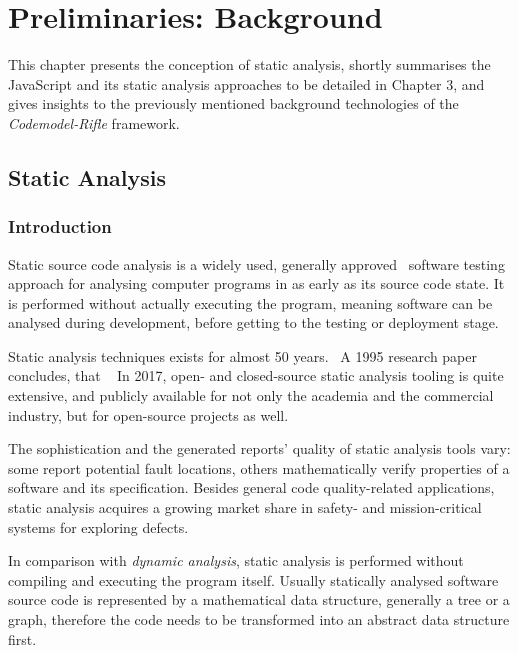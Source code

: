 \chapter{Preliminaries: Background}

This chapter presents the conception of static analysis, shortly summarises the JavaScript and its static analysis approaches to be detailed in Chapter 3, and gives insights to the previously mentioned background technologies of the \emph{Codemodel-Rifle} framework.


\section{Static Analysis}


\subsection{Introduction}

Static source code analysis is a widely used, generally approved~\cite{373902} software testing approach for analysing computer programs in as early as its source code state. It is performed without actually executing the program, meaning software can be analysed during development, before getting to the testing or deployment stage.

Static analysis techniques exists for almost 50 years.~\cite{emanuelsson2008comparative} A 1995 research paper concludes, that ~\cite{373902} In 2017, open- and closed-source static analysis tooling is quite extensive, and publicly available for not only the academia and the commercial industry, but for open-source projects as well.~\cite{wikipedia-static-analysis}

The sophistication and the generated reports' quality of static analysis tools vary: some report potential fault locations, others mathematically verify properties of a software and its specification. Besides general code quality-related applications, static analysis acquires a growing market share in safety- and mission-critical systems for exploring defects.~\cite{livshits2006improving}

In comparison with \emph{dynamic analysis}, static analysis is performed without compiling and executing the program itself. Usually statically analysed software source code is represented by a mathematical data structure, generally a tree or a graph, therefore the code needs to be transformed into an abstract data structure first.


